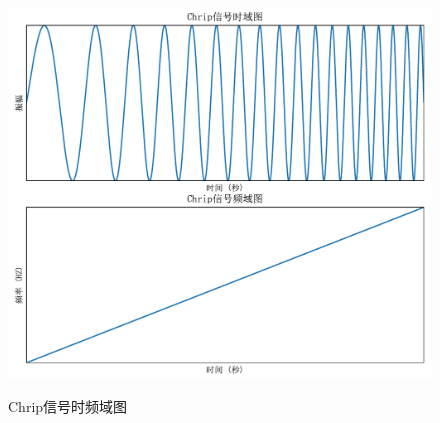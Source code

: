 \begin{figure}[htbp]
	\centering
	\includegraphics[width=0.8\linewidth]{figures/Chrip信号时频域图}\\
	\caption{Chrip信号时频域图}
	\label{chrip}
\end{figure}

